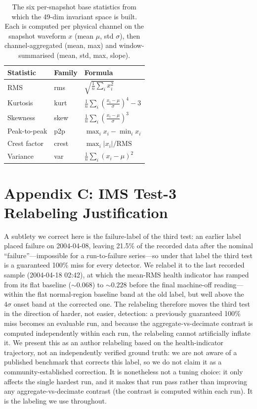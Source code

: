 \documentclass[IJPHM, 2026, 0]{PHMSociety}
\begin{document}
\begin{table}[t] \small
	\begin{center}
	\caption{The six per-snapshot base statistics from which the 49-dim invariant space is built. Each is computed per physical channel on the snapshot waveform $x$ (mean $\mu$, std $\sigma$), then channel-aggregated (mean, max) and window-summarised (mean, std, max, slope).}
	\label{tab:basestats}
	\begin{tabular}{l l l}
		\hline \hline
		\textbf{Statistic} & \textbf{Family} & \textbf{Formula} \\
		\hline
		RMS & rms & $\sqrt{\tfrac{1}{n}\sum_i x_i^2}$ \\
		Kurtosis & kurt & $\tfrac{1}{n}\sum_i (\tfrac{x_i-\mu}{\sigma})^4 - 3$ \\
		Skewness & skew & $\tfrac{1}{n}\sum_i (\tfrac{x_i-\mu}{\sigma})^3$ \\
		Peak-to-peak & p2p & $\max_i x_i - \min_i x_i$ \\
		Crest factor & crest & $\max_i |x_i| / \text{RMS}$ \\
		Variance & var & $\tfrac{1}{n}\sum_i (x_i-\mu)^2$ \\
		\hline \hline
	\end{tabular}
	\end{center}
\end{table}

\FloatBarrier
\section*{Appendix C: IMS Test-3 Relabeling Justification}
A subtlety we correct here is the failure-label of the third test: an earlier label placed failure on 2004-04-08, leaving 21.5\% of the recorded data after the nominal ``failure''---impossible for a run-to-failure series---so under that label the third test is a guaranteed 100\% miss for every detector. We relabel it to the last recorded sample (2004-04-18 02:42), at which the mean-RMS health indicator has ramped from its flat baseline (${\sim}0.068$) to ${\sim}0.228$ before the final machine-off reading---within the flat normal-region baseline band at the old label, but well above the $4\sigma$ onset band at the corrected one. The relabeling therefore moves the third test in the direction of harder, not easier, detection: a previously guaranteed 100\% miss becomes an evaluable run, and because the aggregate-vs-decimate contrast is computed independently within each run, the relabeling cannot artificially inflate it. We present this as an author relabeling based on the health-indicator trajectory, not an independently verified ground truth: we are not aware of a published benchmark that corrects this label, so we do not claim it as a community-established correction. It is nonetheless not a tuning choice: it only affects the single hardest run, and it makes that run pass rather than improving any aggregate-vs-decimate contrast (the contrast is computed within each run). It is the labeling we use throughout.
\end{document}
